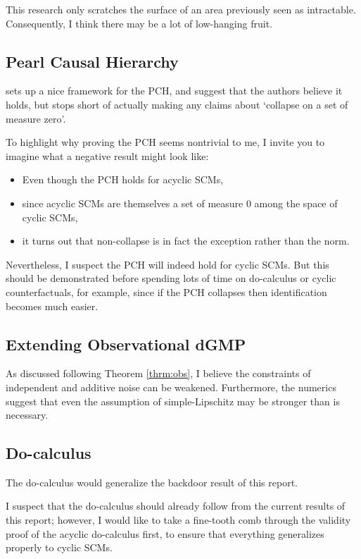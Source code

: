 \documentclass[letterpaper,10pt]{article}
\begin{document}
This research only scratches the surface of an area previously seen as intractable. Consequently, I think there may be a lot of low-hanging fruit. 

\subsection{Pearl Causal Hierarchy}
\cite{Foundations} sets up a nice framework for the PCH, and suggest that the authors believe it holds, but stops short of actually making any claims about `collapse on a set of measure zero'.

To highlight why proving the PCH seems nontrivial to me, I invite you to imagine what a negative result might look like:
\begin{itemize}
  \item Even though the PCH holds for acyclic SCMs,
  \item since acyclic SCMs are themselves a set of measure 0 among the space of cyclic SCMs,
  \item it turns out that non-collapse is in fact the exception rather than the norm.
\end{itemize}

Nevertheless, I suspect the PCH will indeed hold for cyclic SCMs. But this should be demonstrated before spending lots of time on do-calculus or cyclic counterfactuals, for example, since if the PCH collapses then identification becomes much easier.

\subsection{Extending Observational dGMP}

As discussed following Theorem \ref{thrm:obs}, I believe the constraints of independent and additive noise can be weakened. Furthermore, the numerics suggest that even the assumption of simple-Lipschitz may be stronger than is necessary.

\subsection{Do-calculus}

The do-calculus would generalize the backdoor result of this report.

I suspect that the do-calculus should already follow from the current results of this report; however, I would like to take a fine-tooth comb through the validity proof of the acyclic do-calculus first, to ensure that everything generalizes properly to cyclic SCMs.
\end{document}
